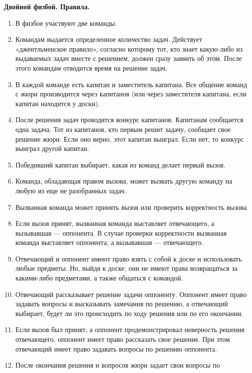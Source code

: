\documentclass[11pt]{article}
\begin{document}
\begin{center}
  \Large{\textbf{Двойной физбой. Правила.}}
\end{center}

\begin{enumerate}
\setlength{\itemsep}{-1mm}
\item В физбое участвуют две команды.
\item Командам выдается определенное количество задач. Действует
  «джентльменское правило», согласно которому тот, кто знает
  какую-либо из выдаваемых задач вместе с решением, должен сразу
  заявить об этом. После этого командам отводится время на решение
  задач.
\item В каждой команде есть капитан и заместитель капитана. Все
  общение команд с жюри производится через капитанов (или через
  заместителя капитана, если капитан находится у доски).
\item После решения задач проводится конкурс капитанов. Капитанам
  сообщается одна задача. Тот из капитанов, кто первым решит задачу,
  сообщает свое решение жюри. Если оно верно, этот капитан
  выиграл. Если нет, то конкурс выиграл другой капитан.
\item Победивший капитан выбирает, какая из команд делает первый
  вызов.
\item Команда, обладающая правом вызова, может вызвать другую команду
  на любую из еще не разобранных задач.
\item Вызванная команда может принять вызов или проверить корректность вызова.
\item Если вызов принят, вызванная команда выставляет отвечающего, а
  вызывавшая --- оппонента. В случае проверки корректности вызванная
  команда выставляет оппонента, а вызывавшая --- отвечающего.
\item Отвечающий и оппонент имеют право взять с собой к доске и
  использовать любые предметы. Но, выйдя к доске, они не имеют права
  возвращаться за какими-либо предметами, а также общаться с командой.
\item Отвечающий рассказывает решение задачи оппоненту. Оппонент имеет
  право задавать вопросы и высказывать замечания по решению, а
  отвечающий выбирает, будет ли это происходить по ходу решения или по
  его окончании.
\item Если вызов был принят, а оппонент продемонстрировал неверность
  решения отвечающего, оппонент имеет право рассказать свое
  решение. При этом отвечающий имеет право задавать вопросы по решению
  оппонента.
\item После окончания решения и вопросов жюри задает свои вопросы по

\end{enumerate}
\end{document}
